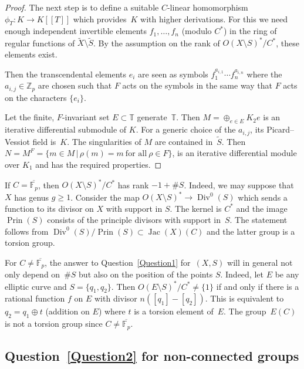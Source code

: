 \documentclass[pdftex]{sigma}
\numberwithin{equation}{section}
\begin{document}
\begin{proof}
The next step is to define a suitable $C$-linear homomorphism $\phi_T\colon K\rightarrow K[[T]]$ which provides~$K$ with higher derivations. For this we need enough independent invertible elements $f_1,\dots ,f_n$ (modulo $C^*$) in the ring of regular functions of $\tilde{X}\setminus \tilde{S}$. By the assumption on the rank of $O(X\setminus S)^*/C^*$, these elements exist.

Then the transcendental elements $e_i$ are seen as symbols $f_1^{a_{i,1}}\cdots f_n^{a_{i,n}}$ where the $a_{i,j}\in \mathbb{Z}_p$ are chosen such that $F$ acts on the symbols
in the same way that $F$ acts on the characters $\{e_i\}$.

Let the finite, $F$-invariant set $E\subset \mathbb{T}$ generate~$\mathbb{T}$. Then $M=\oplus _{e\in E}K_2e$ is an iterative differential submodule of $K$. For a generic choice of the $a_{i,j}$, its Picard--Vessiot field is~$K$. The singularities of $M$ are contained in~$\tilde{S}$. Then $N=M^F=\{m\in M\, | \, \rho(m)=m \ \text{for all} \ \rho \in F\}$,
is an iterative differential module over $K_1$ and has the required properties. \end{proof}

\begin{Remarks}\label{2.3} If $C=\overline{\mathbb{F}_p}$, then $O(X\setminus S)^*/C^*$ has rank $-1+\#S$. Indeed, we may suppose that $X$ has genus $g\geq 1$. Consider the map $O(X\setminus S)^*\rightarrow \operatorname{Div}^0(S)$ which sends a function to its divisor on $X$ with support in $S$. The kernel is $C^*$ and the image $\operatorname{Prin}(S)$ consists of the principle divisors with support in~$S$. The statement follows from $\operatorname{Div}^0(S)/\operatorname{Prin}(S)\subset \operatorname{Jac}(X)(C)$ and the latter group is a torsion group.

For $C\neq \overline{\mathbb{F}_p}$, the answer to Question~\ref{Question1} for~$(X,S)$ will in general not only depend on~$\# S$ but also on the position of the points $S$. Indeed, let $E$ be any elliptic curve and $S=\{q_1,q_2\}$. Then $O(E\setminus S)^*/C^*\neq \{1\}$ if and only if there is a rational function $f$ on $E$ with divisor $n([q_1]-[q_2])$. This is equivalent to $q_2=q_1\oplus t$ (addition on $E$) where $t$ is a torsion element of~$E$. The group~$E(C)$ is not a torsion group since $C\neq \overline{\mathbb{F}_p}$.\end{Remarks}

\subsection{Question~\ref{Question2} for non-connected groups}\label{section2.3}
\end{document}

